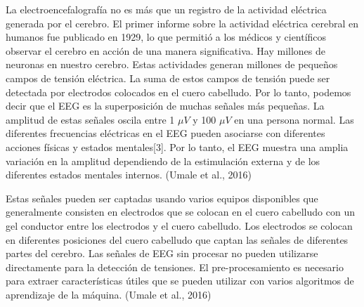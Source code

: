 La electroencefalografía no es más que un registro de la actividad eléctrica generada por el cerebro. El primer informe sobre la actividad eléctrica cerebral en humanos fue publicado en 1929, lo que permitió a los médicos y científicos observar el cerebro en acción de una manera significativa. Hay millones de neuronas en nuestro cerebro. Estas actividades generan millones de pequeños campos de tensión eléctrica.  La suma de estos campos de tensión puede ser detectada por electrodos colocados en el cuero cabelludo.  Por lo tanto, podemos decir que el EEG es la superposición de muchas señales más pequeñas.  La amplitud de estas señales oscila entre 1 $\mu V$ y 100 $\mu V$ en una persona normal. Las diferentes frecuencias eléctricas en el EEG pueden asociarse con diferentes acciones físicas y estados mentales[3]. Por lo tanto, el EEG muestra una amplia variación en la amplitud dependiendo de la estimulación externa y de los diferentes estados mentales internos. (Umale et al., 2016)

Estas señales pueden ser captadas usando varios equipos disponibles que generalmente consisten en electrodos que se colocan en el cuero cabelludo con un gel conductor entre los electrodos y el cuero cabelludo.  Los electrodos se colocan en diferentes posiciones del cuero cabelludo que captan las señales de diferentes partes del cerebro. Las señales de EEG sin procesar no pueden utilizarse directamente para la detección de tensiones. El pre-procesamiento es necesario para extraer características útiles que se pueden utilizar con varios algoritmos de aprendizaje de la máquina. (Umale et al., 2016)




